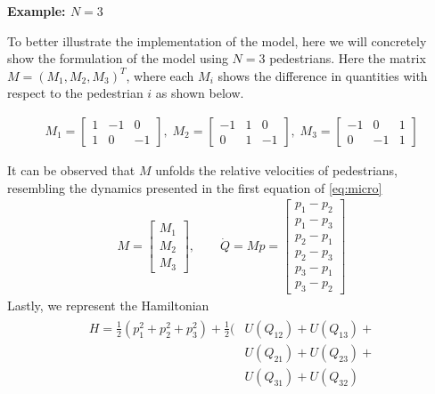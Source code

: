 \hrulefill

\textbf{Example: $N=3$}

To better illustrate the implementation of the model, here we will concretely show the formulation of the model using $N=3$ pedestrians. Here the matrix $M = (M_1, M_2, M_3)^T$, where each $M_i$ shows the difference in quantities with respect to the pedestrian $i$ as shown below.

\begin{gather*}
    M_1 = 
    \begin{bmatrix}
        1 & -1 & 0 \\
        1 & 0 & -1 
    \end{bmatrix},\;
    M_2 = 
    \begin{bmatrix}
        -1 & 1 & 0 \\
        0 & 1 & -1 
    \end{bmatrix},\;
    M_3 = 
    \begin{bmatrix}
        -1 & 0 & 1 \\
        0 & -1 & 1 
    \end{bmatrix}
\end{gather*}

It can be observed that $M$ unfolds the relative velocities of pedestrians, resembling the dynamics presented in the first equation of \autoref{eq:micro}
\begin{gather*}
    M = 
    \begin{bmatrix}
        M_1 \\ 
        M_2 \\
        M_3
    \end{bmatrix}, \qquad
    \dot Q = Mp = 
    \begin{bmatrix}
        p_1 - p_2 \\
        p_1 - p_3 \\
        p_2 - p_1 \\
        p_2 - p_3 \\
        p_3 - p_1 \\
        p_3 - p_2 
    \end{bmatrix}
\end{gather*}
Lastly, we represent the Hamiltonian
\begin{gather*}
    \begin{aligned}
        H = \frac{1}{2}(p_1^2 + p_2^2 + p_3^2) + \frac{1}{2}(& U(Q_{12}) +   U(Q_{13}) + \\  
        &  U(Q_{21}) +  U(Q_{23}) + \\ 
        &  U(Q_{31}) +  U(Q_{32})
    \end{aligned}    
\end{gather*}


